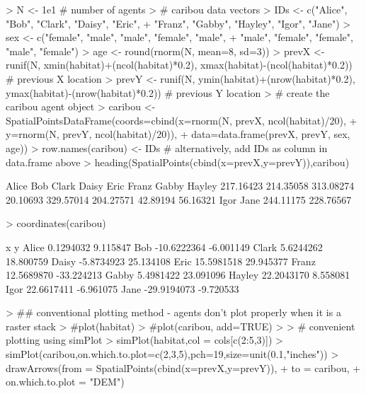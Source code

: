 \documentclass{article}
\begin{document}
\begin{Schunk}
\begin{Sinput}
> N <- 1e1 # number of agents
> # caribou data vectors
> IDs <- c("Alice", "Bob", "Clark", "Daisy", "Eric",
+          "Franz", "Gabby", "Hayley", "Igor", "Jane")
> sex <- c("female", "male", "male", "female", "male",
+          "male", "female", "female", "male", "female")
> age <- round(rnorm(N, mean=8, sd=3))
> prevX <- runif(N, xmin(habitat)+(ncol(habitat)*0.2), xmax(habitat)-(ncol(habitat)*0.2)) # previous X location
> prevY <- runif(N, ymin(habitat)+(nrow(habitat)*0.2), ymax(habitat)-(nrow(habitat)*0.2)) # previous Y location
> # create the caribou agent object
> caribou <- SpatialPointsDataFrame(coords=cbind(x=rnorm(N, prevX, ncol(habitat)/20),
+                                                y=rnorm(N, prevY, ncol(habitat)/20)),
+                                   data=data.frame(prevX, prevY, sex, age))
> row.names(caribou) <- IDs # alternatively, add IDs as column in data.frame above
> heading(SpatialPoints(cbind(x=prevX,y=prevY)),caribou)
\end{Sinput}
\begin{Soutput}
    Alice       Bob     Clark     Daisy      Eric     Franz     Gabby    Hayley 
217.16423 214.35058 313.08274  20.10693 329.57014 204.27571  42.89194  56.16321 
     Igor      Jane 
244.11175 228.76567 
\end{Soutput}
\begin{Sinput}
> coordinates(caribou)
\end{Sinput}
\begin{Soutput}
                 x          y
Alice    0.1294032   9.115847
Bob    -10.6222364  -6.001149
Clark    5.6244262  18.800759
Daisy   -5.8734923  25.134108
Eric    15.5981518  29.945377
Franz   12.5689870 -33.224213
Gabby    5.4981422  23.091096
Hayley  22.2043170   8.558081
Igor    22.6617411  -6.961075
Jane   -29.9194073  -9.720533
\end{Soutput}
\begin{Sinput}
> ## conventional plotting method - agents don't plot properly when it is a raster stack
> #plot(habitat)
> #plot(caribou, add=TRUE)
> 
> # convenient plotting using simPlot
> simPlot(habitat,col = cols[c(2:5,3)])
> simPlot(caribou,on.which.to.plot=c(2,3,5),pch=19,size=unit(0.1,"inches"))
> drawArrows(from = SpatialPoints(cbind(x=prevX,y=prevY)),
+            to = caribou,
+            on.which.to.plot = "DEM")
\end{Sinput}
\end{Schunk}
\end{document}
